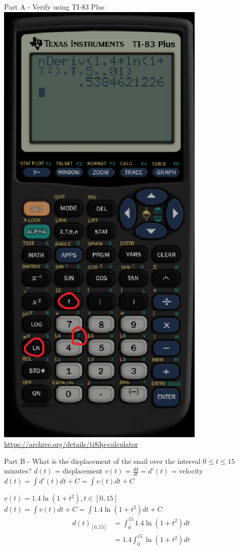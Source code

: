 \documentclass{beamer}
\begin{document}
\begin{frame}{Part A - Verify using TI-83 Plus}
    \includegraphics[scale=0.33]{3}
    \tiny \url{https://archive.org/details/ti83p-calculator}
\end{frame}





\begin{frame}{Part B - What is the displacement of the snail over the interval $0\leq t\leq 15$ minutes?}
    $d(t)$ = displacement \newline
    $v(t) = \frac{dd}{dt} = d'(t)$ = velocity \newline
    $d(t) = \int d'(t)dt + C = \int v(t)dt + C$ \newline
    \pause
    
    $v(t) = 1.4\ln(1+t^2), t\in [0,15]$ \newline
    $d(t) = \int v(t)dt + C = \int 1.4\ln(1+t^2)dt + C$ \newline \newline
    \begin{align*}
    d(t)_{[0,15]} &= \int_0^{15} 1.4\ln(1+t^2)dt\\
    &= 1.4 \int_0^{15} \ln(1+t^2)dt
    \end{align*}
\end{frame}
\end{document}
